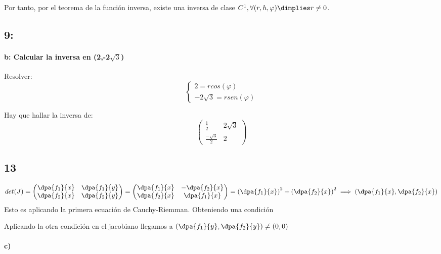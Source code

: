 \documentclass{apuntes}
\begin{document}
      Por tanto, por el teorema de la función inversa, existe una inversa de clase $C^1, \forall (r,h,\varphi) \dimplies r\neq 0$.

 \subsection{9:}
 
 \paragraph{b: Calcular la inversa en (2,-2$\sqrt{3}$)}
 
 Resolver: $$\left\{\begin{matrix} 2 = rcos(\varphi)\\-2\sqrt{3} = rsen(\varphi)\end{matrix}\right.$$
 
 Hay que hallar la inversa de: $$\begin{pmatrix}
                                  \frac{1}{2}&2\sqrt{3}\\
                                  \frac{-\sqrt{3}}{2}&2
                                 \end{pmatrix}$$

                                 
  \subsection{13}
  
  $$det(J) = \begin{pmatrix}
              \dpa{f_1}{x}&\dpa{f_1}{y}\\
              \dpa{f_2}{x}&\dpa{f_2}{y}
             \end{pmatrix} = 
             \begin{pmatrix}
              \dpa{f_1}{x}&-\dpa{f_2}{x}\\
              \dpa{f_2}{x}& \dpa{f_1}{x}
             \end{pmatrix}
      = \left(\dpa{f_1}{x}\right)^2 + \left(\dpa{f_2}{x}\right)^2 \implies \left(\dpa{f_1}{x},\dpa{f_2}{x}\right)$$
Esto es aplicando la primera ecuación de Cauchy-Riemman. Obteniendo una condición

Aplicando la otra condición en el jacobiano llegamos a $\displaystyle\left(\dpa{f_1}{y},\dpa{f_2}{y}\right)\neq (0,0)$
\paragraph{c)}
\end{document}
